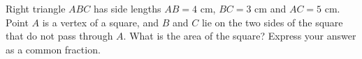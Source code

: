 Right triangle $ABC$ has side lengths $AB=4$ cm, $BC=3$ cm and $AC=5$ cm. Point $A$ is a vertex of a square, and $B$ and $C$ lie on the two sides of the square that do not pass through $A$. What is the area of the square? Express your answer as a common fraction.
